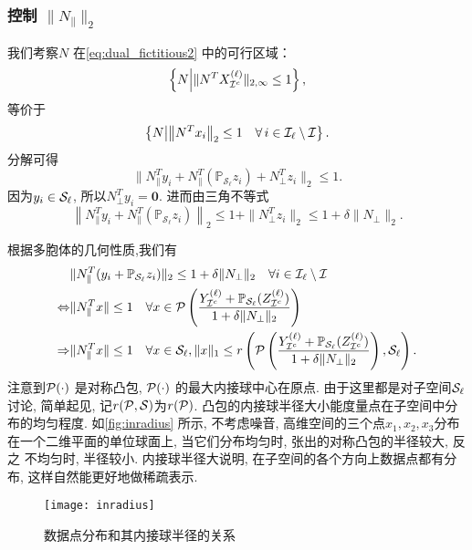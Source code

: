 \subsubsection{控制 \(\|N_{\parallel}\|_2\)}
我们考察\(N\) 在\eqref{eq:dual_fictitious2} 中的可行区域：
\[\left\{N \middle| \|N^T X^{(\ell)}_{\mathcal{I}^c}\|_{2,\infty} \leq 1\right\},\]
等价于
\[\left\{N \middle|\left \| N^T x_i\right\|_2 \leq 1 \quad \forall \, i \in \mathcal{I}_\ell
\setminus \mathcal{I} \right\}.\]
分解可得
\[\| N_{\parallel}^T y_i+N_{\parallel}^T (\mathbb{P}_{\mathcal{S}_{\ell}}z_i)+
N_{\perp}^T z_i\|_2 \leq 1.\]
因为\(y_i \in \mathcal{S}_\ell\), 所以\(N_\perp^T y_i=\mathbf{0}\). 进而由三角不等式
\begin{equation}\label{eq:relax_constraint}
  \left\| N_{\parallel}^T y_i+N_{\parallel}^T
  (\mathbb{P}_{\mathcal{S}_{\ell}}z_i)\right \|_2
  \leq 1+\|N_{\perp}^T z_i\|_2 \leq 1+\delta\|N_{\perp}\|_2.
\end{equation}

根据多胞体的几何性质,我们有
\begin{align}
  & \| N_{\parallel}^T (y_i+ \mathbb{P}_{\mathcal{S}_{\ell}}z_i) \|_2 \leq
  1+\delta\|N_{\perp}\|_2 \quad \forall i \in \mathcal{I}_\ell \setminus \mathcal{I}\nonumber\\
  \Leftrightarrow & \|N_{\parallel}^T x\| \leq 1 \quad \forall x \in \mathcal{P}\left(\frac{Y_{\mathcal{I}^c}^{(\ell)}+
  \mathbb{P}_{\mathcal{S}_{\ell}}(Z_{\mathcal{I}^c}^{(\ell)})}{1+\delta\|N_{\perp}\|_2}\right)
  \nonumber\\
  \Rightarrow & \|N_{\parallel}^T x\| \leq 1 \quad \forall x \in \mathcal{S}_\ell,
  \|x\|_1 \le r\left(\mathcal{P}\left(\frac{Y_{\mathcal{I}^c}^{(\ell)}+
  \mathbb{P}_{\mathcal{S}_{\ell}}(Z_{\mathcal{I}^c}^{(\ell)})}{1+\delta\|N_{\perp}\|_2}\right),
  \mathcal{S}_\ell\right).\label{eq:Geometric_dual}
\end{align}
注意到\(\mathcal{P}(\cdot)\) 是对称凸包, \(\mathcal{P}(\cdot)\) 的最大内接球中心在原点.
由于这里都是对子空间\(\mathcal{S}_\ell\)讨论, 简单起见, 记\(r(\mathcal{P}, \mathcal{S})\)为\(r(\mathcal{P})\).
凸包的内接球半径大小能度量点在子空间中分布的均匀程度.
如\autoref{fig:inradius} 所示, 不考虑噪音, 高维空间的三个点\(x_1, x_2,
x_3\)分布在一个二维平面的单位球面上, 当它们分布均匀时, 张出的对称凸包的半径较大, 反之
不均匀时, 半径较小. 内接球半径大说明, 在子空间的各个方向上数据点都有分布,
这样自然能更好地做稀疏表示.

\begin{figure}[tb]
  \centering
  \texttt{[image: inradius]}
  \caption{数据点分布和其内接球半径的关系}
  \label{fig:inradius}
\end{figure}

